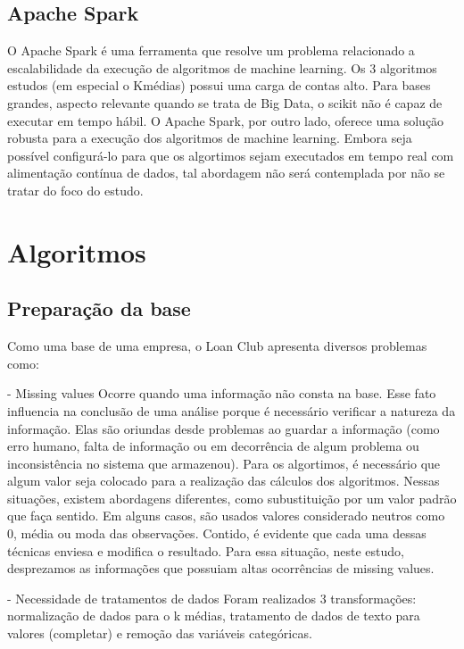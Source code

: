 \subsection{Apache Spark}

O Apache Spark é uma ferramenta que resolve um problema relacionado a escalabilidade da execução de algoritmos de machine learning. Os 3 algoritmos estudos (em especial o Kmédias) possui uma carga de contas alto. Para bases grandes, aspecto relevante quando se trata de Big Data, o scikit não é capaz de executar em tempo hábil. O Apache Spark, por outro lado, oferece uma solução robusta para a execução dos algoritmos de machine learning. Embora seja possível configurá-lo para que os algortimos sejam executados em tempo real com alimentação contínua de dados, tal abordagem não será contemplada por não se tratar do foco do estudo.

\section{Algoritmos}

\subsection{Preparação da base}

Como uma base de uma empresa, o Loan Club apresenta diversos problemas como:

- Missing values
Ocorre quando uma informação não consta na base. Esse fato influencia na conclusão de uma análise porque é necessário verificar a natureza da informação. Elas são oriundas desde problemas ao guardar a informação (como erro humano, falta de informação ou em decorrência de algum problema ou inconsistência no sistema que armazenou). Para os algortimos, é necessário que algum valor seja colocado para a realização das cálculos dos algoritmos. Nessas situações, existem abordagens diferentes, como subustituição por um valor padrão que faça sentido. Em alguns casos, são usados valores considerado neutros como 0, média ou moda das observações. Contido, é evidente que cada uma dessas técnicas enviesa e modifica o resultado. Para essa situação, neste estudo, desprezamos as informações que possuiam altas ocorrências de missing values.

- Necessidade de tratamentos de dados
Foram realizados 3 transformações: normalização de dados para o k médias, tratamento de dados de texto para valores (completar) e remoção das variáveis categóricas.

